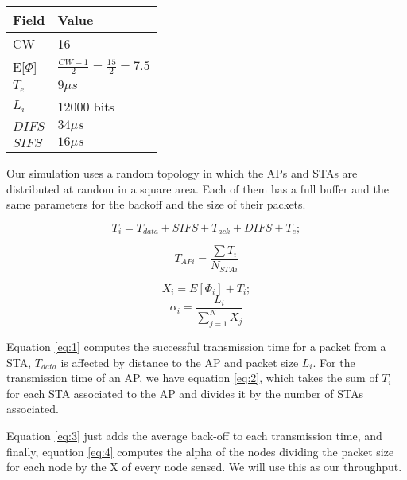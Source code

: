 \documentclass{article}
\begin{document}
\begin{center}\renewcommand*{\arraystretch}{1.25}
\setlength\tabcolsep{15pt}

\begin{tabular}{|P{1cm}|P{7.25cm}|}


  \hline
  
   \textbf{Field} & \textbf{Value}\\ \hline
  CW & 16 \\\hline
   E[$\Phi$] & $\frac{CW-1}{2}=\frac{15}{2}=7.5$ \\\hline
  $T_e$ & $9 \mu s$\\\hline
  $L_i$ & 12000 bits\\\hline
  $DIFS$ & $34 \mu s$\\\hline
  $SIFS$ & $16 \mu s$\\\hline


\end{tabular}

\end{center}

Our simulation uses a random topology in which the APs and STAs are distributed at random in a square area. Each of them has a full buffer and the same parameters for the backoff and the size of their packets.

\begin{equation}\label{eq:1}
    T_{i}= T_{data} + SIFS + T_{ack} + DIFS + T_e;
\end{equation}

\begin{equation}\label{eq:2}
    T_{APi}=\frac{\sum T_i}{N_{STAi}}
\end{equation}

\begin{equation}\label{eq:3}
   X_i=E[\Phi_i]+T_i;
\end{equation}
\begin{equation}\label{eq:4}
    \alpha_i = \frac{L_i}{\sum_{j=1}^{N} X_{j}}
\end{equation}

Equation \ref{eq:1} computes the successful transmission time for a packet from a STA, $T_{data}$ is affected by distance to the AP and packet size $L_i$. For the transmission time of an AP, we have equation \ref{eq:2}, which takes the sum of $T_i$ for each STA associated to the AP and divides it by the number of STAs associated.

Equation \ref{eq:3} just adds the average back-off to each transmission time, and finally, equation \ref{eq:4} computes the alpha of the nodes dividing the packet size for each node by the X of every node sensed. We will use this as our throughput.
\end{document}
